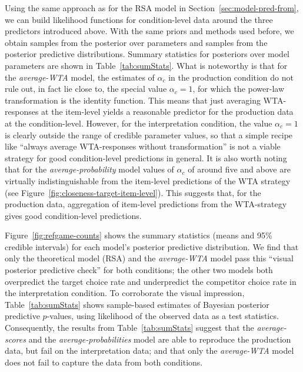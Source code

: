 \documentclass[fleqn]{article}
\begin{document}
Using the same approach as for the RSA model in Section~\ref{sec:model-pred-from}, we can build likelihood functions for condition-level data around the three predictors introduced above.
With the same priors and methods used before, we obtain samples from the posterior over parameters and samples from the posterior predictive distributions.
Summary statistics for posteriors over model parameters are shown in Table~\ref{tab:sumStats}.
What is noteworthy is that for the \emph{average-WTA} model, the estimates of $\alpha_{c}$ in the production condition do not rule out, in fact lie close to, the special value $\alpha_{c}=1$, for which the power-law transformation is the identity function.
This means that just averaging WTA-responses at the item-level yields a reasonable predictor for the production data at the condition-level.
However, for the interpretation condition, the value $\alpha_{c}=1$ is clearly outside the range of credible parameter values, so that a simple recipe like ``always average WTA-responses without transformation'' is not a viable strategy for good condition-level predictions in general.
It is also worth noting that for the \emph{average-probability} model values of $\alpha_{c}$ of around five and above are virtually indistinguishable from the item-level predictions of the WTA strategy (see Figure~\ref{fig:closeness-target-item-level}).
This suggests that, for the production data, aggregation of item-level predictions from the WTA-strategy gives good condition-level predictions.

Figure~\ref{fig:refgame-counts} shows the summary statistics (means and 95\% credible intervals) for each model's posterior predictive distribution.
We find that only the theoretical model (RSA) and the \emph{average-WTA} model pass this ``visual posterior predictive check'' for both conditions; the other two models both overpredict the target choice rate and underpredict the competitor choice rate in the interpretation condition.
To corroborate the visual impression, Table~\ref{tab:sumStats} shows sample-based estimates of Bayesian posterior predictive $p$-values, using likelihood of the observed data as a test statistics.
Consequently, the results from Table~\ref{tab:sumStats} suggest that the \emph{average-scores} and the \emph{average-probabilities} model are able to reproduce the production data, but fail on the interpretation data; and that only the \emph{average-WTA} model does not fail to capture the data from both conditions.
\end{document}
